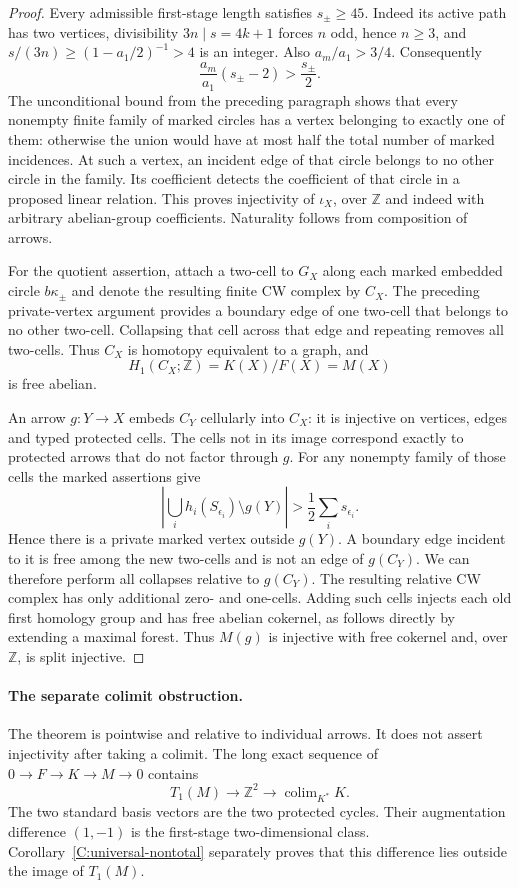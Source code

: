 \begin{proof}
Every admissible first-stage length satisfies $s_\pm\geq45$.
Indeed its active path has two vertices, divisibility
$3n\mid s=4k+1$ forces $n$ odd, hence $n\geq3$, and
$s/(3n)\geq(1-a_1/2)^{-1}>4$ is an integer. Also
$a_m/a_1>3/4$. Consequently
\[
 \frac{a_m}{a_1}(s_\pm-2)>\frac{s_\pm}{2}.
\]
The unconditional bound from the preceding paragraph shows that every
nonempty finite family of marked circles has a vertex belonging to
exactly one of them: otherwise the union would have at most half the
total number of marked incidences. At such a vertex, an incident edge
of that circle belongs to no other circle in the family. Its
coefficient detects the coefficient of that circle in a proposed
linear relation. This proves injectivity of $\iota_X$, over
$\mathbb Z$ and indeed with arbitrary abelian-group coefficients.
Naturality follows from composition of arrows.

For the quotient assertion, attach a two-cell to $G_X$ along each
marked embedded circle $b\kappa_\pm$ and denote the resulting finite
CW complex by $C_X$. The preceding private-vertex argument provides
a boundary edge of one two-cell that belongs to no other two-cell.
Collapsing that cell across that edge and repeating removes all
two-cells. Thus $C_X$ is homotopy equivalent to a graph, and
\[
 H_1(C_X;\mathbb Z)=K(X)/F(X)=M(X)
\]
is free abelian.

An arrow $g:Y\to X$ embeds $C_Y$ cellularly into $C_X$: it is
injective on vertices, edges and typed protected cells. The cells not
in its image correspond exactly to protected arrows that do not
factor through $g$. For any nonempty family of those cells the marked
assertions give
\[
 \left|\bigcup_i h_i(S_{\epsilon_i})\setminus g(Y)\right|
 >\frac12\sum_i s_{\epsilon_i}.
\]
Hence there is a private marked vertex outside $g(Y)$. A boundary
edge incident to it is free among the new two-cells and is not an
edge of $g(C_Y)$. We can therefore perform all collapses relative
to $g(C_Y)$. The resulting relative CW complex has only additional
zero- and one-cells. Adding such cells injects each old first homology
group and has free abelian cokernel, as follows directly by extending
a maximal forest. Thus $M(g)$ is injective with free cokernel and,
over $\mathbb Z$, is split injective.
\end{proof}

\paragraph{The separate colimit obstruction.}
The theorem is pointwise and relative to individual arrows. It does
not assert injectivity after taking a colimit. The long exact sequence
of $0\to F\to K\to M\to0$ contains
\[
 T_1(M)\longrightarrow\mathbb Z^2
 \longrightarrow\operatorname{colim}_{K^*}K.
\]
The two standard basis vectors are the two protected cycles. Their
augmentation difference $(1,-1)$ is the first-stage two-dimensional
class. Corollary~\ref{C:universal-nontotal} separately proves that
this difference lies outside the image of $T_1(M)$.

